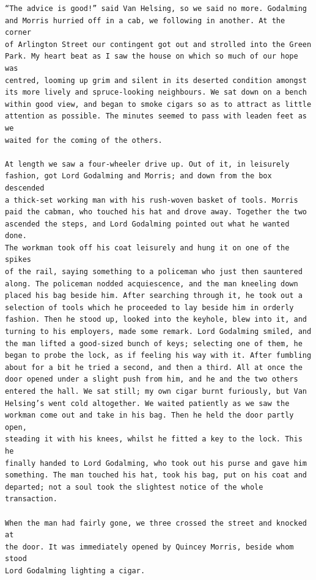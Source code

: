 \documentclass{article}
\begin{document}
\begin{verbatim}
“The advice is good!” said Van Helsing, so we said no more. Godalming
and Morris hurried off in a cab, we following in another. At the corner
of Arlington Street our contingent got out and strolled into the Green
Park. My heart beat as I saw the house on which so much of our hope was
centred, looming up grim and silent in its deserted condition amongst
its more lively and spruce-looking neighbours. We sat down on a bench
within good view, and began to smoke cigars so as to attract as little
attention as possible. The minutes seemed to pass with leaden feet as we
waited for the coming of the others.

At length we saw a four-wheeler drive up. Out of it, in leisurely
fashion, got Lord Godalming and Morris; and down from the box descended
a thick-set working man with his rush-woven basket of tools. Morris
paid the cabman, who touched his hat and drove away. Together the two
ascended the steps, and Lord Godalming pointed out what he wanted done.
The workman took off his coat leisurely and hung it on one of the spikes
of the rail, saying something to a policeman who just then sauntered
along. The policeman nodded acquiescence, and the man kneeling down
placed his bag beside him. After searching through it, he took out a
selection of tools which he proceeded to lay beside him in orderly
fashion. Then he stood up, looked into the keyhole, blew into it, and
turning to his employers, made some remark. Lord Godalming smiled, and
the man lifted a good-sized bunch of keys; selecting one of them, he
began to probe the lock, as if feeling his way with it. After fumbling
about for a bit he tried a second, and then a third. All at once the
door opened under a slight push from him, and he and the two others
entered the hall. We sat still; my own cigar burnt furiously, but Van
Helsing’s went cold altogether. We waited patiently as we saw the
workman come out and take in his bag. Then he held the door partly open,
steading it with his knees, whilst he fitted a key to the lock. This he
finally handed to Lord Godalming, who took out his purse and gave him
something. The man touched his hat, took his bag, put on his coat and
departed; not a soul took the slightest notice of the whole transaction.

When the man had fairly gone, we three crossed the street and knocked at
the door. It was immediately opened by Quincey Morris, beside whom stood
Lord Godalming lighting a cigar.


\end{verbatim}
\end{document}
